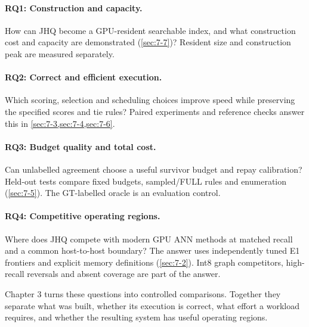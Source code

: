 \paragraph{RQ1: Construction and capacity.}
How can JHQ become a GPU-resident searchable index, and what construction cost and capacity are demonstrated (\cref{sec:7-7})? Resident size and construction peak are measured separately.

\paragraph{RQ2: Correct and efficient execution.}
Which scoring, selection and scheduling choices improve speed while preserving the specified scores and tie rules? Paired experiments and reference checks answer this in \cref{sec:7-3,sec:7-4,sec:7-6}.

\paragraph{RQ3: Budget quality and total cost.}
Can unlabelled agreement choose a useful survivor budget and repay calibration? Held-out tests compare fixed budgets, sampled/FULL rules and enumeration (\cref{sec:7-5}). The GT-labelled oracle is an evaluation control.

\paragraph{RQ4: Competitive operating regions.}
Where does JHQ compete with modern GPU ANN methods at matched recall and a common host-to-host boundary?
The answer uses independently tuned E1 frontiers and explicit memory
definitions (\cref{sec:7-2}). Int8 graph competitors, high-recall reversals
and absent coverage are part of the answer.

Chapter 3 turns these questions into controlled comparisons. Together they
separate what was built, whether its execution is correct, what effort a
workload requires, and whether the resulting system has useful operating
regions.

